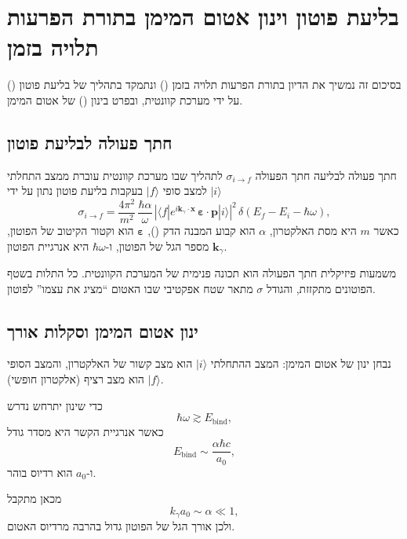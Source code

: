 \section{בליעת פוטון וינון אטום המימן בתורת הפרעות תלויה בזמן}

בסיכום זה נמשיך את הדיון בתורת הפרעות תלויה בזמן () ונתמקד בתהליך של בליעת פוטון () על ידי מערכת קוונטית, ובפרט בינון () של אטום המימן.

\subsection{חתך פעולה לבליעת פוטון}

\begin{definitionbox}{חתך פעולה לבליעה}
חתך הפעולה $\sigma_{i\to f}$ לתהליך שבו מערכת קוונטית עוברת ממצב התחלתי $|i\rangle$ למצב סופי $|f\rangle$ בעקבות בליעת פוטון נתון על ידי
\[
\sigma_{i\to f}
=
\frac{4\pi^2}{m^2}\,
\frac{\hbar \alpha}{\omega}
\,
\left|
\langle f | 
e^{i\mathbf{k}_\gamma\cdot\mathbf{x}}
\,\boldsymbol{\varepsilon}\cdot\mathbf{p}
| i \rangle
\right|^2
\,
\delta(E_f - E_i - \hbar\omega),
\]
כאשר $m$ היא מסת האלקטרון, $\alpha$ הוא קבוע המבנה הדק (),
$\boldsymbol{\varepsilon}$ הוא וקטור הקיטוב של הפוטון,
$\mathbf{k}_\gamma$ מספר הגל של הפוטון,
ו-$\hbar\omega$ היא אנרגיית הפוטון.
\end{definitionbox}

\begin{notebox}{משמעות פיזיקלית}
חתך הפעולה הוא תכונה פנימית של המערכת הקוונטית. כל התלות בשטף הפוטונים מתקזזת,
והגודל $\sigma$ מתאר שטח אפקטיבי שבו האטום ``מציג את עצמו'' לפוטון.
\end{notebox}

\subsection{ינון אטום המימן וסקלות אורך}

נבחן ינון של אטום המימן:  
המצב ההתחלתי $|i\rangle$ הוא מצב קשור של האלקטרון,
והמצב הסופי $|f\rangle$ הוא מצב רציף (אלקטרון חופשי).

כדי שינון יתרחש נדרש
\[
\hbar\omega \gtrsim E_{\text{bind}},
\]
כאשר אנרגיית הקשר היא מסדר גודל
\[
E_{\text{bind}} \sim \frac{\alpha\hbar c}{a_0},
\]
ו-$a_0$ הוא רדיוס בוהר.

מכאן מתקבל
\[
k_\gamma a_0 \sim \alpha \ll 1,
\]
ולכן אורך הגל של הפוטון גדול בהרבה מרדיוס האטום.

